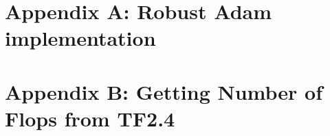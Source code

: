 \documentclass[fleqn,12pt]{olplainarticle}
\begin{document}

\clearpage
\appendix
\section{Appendix A: Robust Adam implementation}  \label{app:RoAdam}

\clearpage
\section{Appendix B: Getting Number of Flops from TF2.4}  \label{app:flops}

\end{document}
